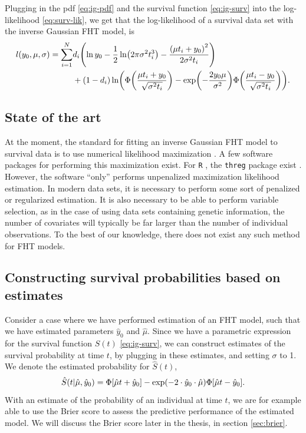 Plugging in the pdf \eqref{eq:ig-pdf} and the survival function \eqref{eq:ig-surv} into the log-likelihood \eqref{eq:surv-lik}, we get that the log-likelihood of a survival data set with the inverse Gaussian FHT model, is
\begin{align}\label{eq:loglik}
\begin{split}
    l(y_0,\mu,\sigma)=\sum_{i=1}^N&d_i\p*{\ln y_0-\frac{1}{2}\ln\p*{2\pi\sigma^2\ti^3}-\frac{\p*{\mu\ti+y_0}^2}{2\sigma^2\ti}} \\
    &+
    (1-d_i)\ln\p*{\Phi\p*{\frac{\mu\ti+y_0}{\sqrt{\sigma^2\ti}}}-\exp\p*{-\frac{2y_0\mu}{\sigma^2}}\Phi\p*{\frac{\mu\ti-y_0}{\sqrt{\sigma^2\ti}}}}.
\end{split}
\end{align}

\subsection{State of the art}
At the moment, the standard for fitting an inverse Gaussian FHT model to survival data is to use numerical likelihood maximization \citep{caroni2017}.
A few software packages for performing this maximization exist.
For \verb|R| \citep{Rlang}, the \verb|threg| package exist \citep{threg}.
However, the software ``only'' performs unpenalized maximization likelihood estimation.
In modern data sets, it is necessary to perform some sort of penalized or regularized estimation.
It is also necessary to be able to perform variable selection, as in the case of using data sets containing genetic information, the number of covariates will typically be far larger than the number of individual observations.
To the best of our knowledge, there does not exist any such method for FHT models.

\subsection{Constructing survival probabilities based on estimates}
Consider a case where we have performed estimation of an FHT model, such that we have estimated parameters $\hat{y}_0$ and $\hat{\mu}$.
Since we have a parametric expression for the survival function $S(t)$ \eqref{eq:ig-surv}, we can construct estimates of the survival probability at time $t$, by plugging in these estimates, and setting $\sigma$ to 1.
We denote the estimated probability for $\hat{S}(t)$,
\begin{equation*}
    \hat{S}(t|\hat{\mu},\hat{y}_0)=\Phi\sqb*{\hat{\mu} t+\hat{y}_0}-\exp\p*{-2\cdot\hat{y}_0\cdot\hat{\mu}}\Phi\sqb*{\hat{\mu} t-\hat{y}_0}.
\end{equation*}
With an estimate of the probability of an individual at time $t$, we are for example able to use the Brier score to assess the predictive performance of the estimated model.
We will discuss the Brier score later in the thesis, in section \ref{sec:brier}.

